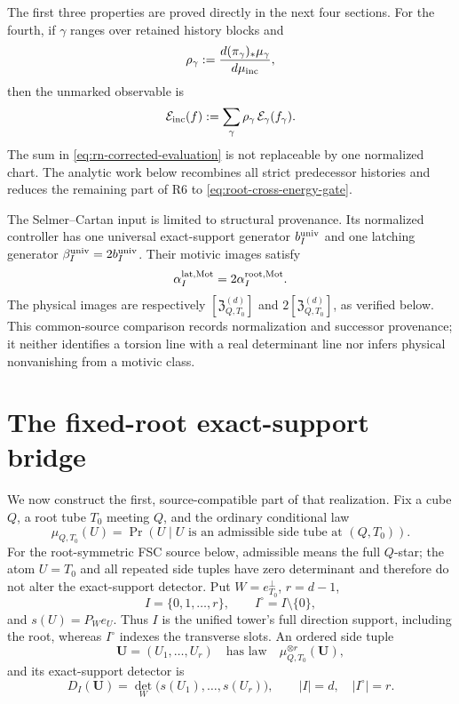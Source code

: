 \documentclass[11pt]{article}
\newcommand{\Mot}{\mathrm{Mot}}
\begin{document}
The first three properties are proved directly in the next four sections.
For the fourth, if \(\gamma\) ranges over retained history blocks and
\[
 \rho_\gamma
 :=
 \frac{d(\pi_\gamma)_*\mu_\gamma}{d\mu_{\rm inc}},
\]
then the unmarked observable is
\begin{equation}\label{eq:rn-corrected-evaluation}
 \mathcal E_{\rm inc}(f)
 :=
 \sum_\gamma\rho_\gamma\,\mathcal E_\gamma(f_\gamma).
\end{equation}
The sum in \eqref{eq:rn-corrected-evaluation} is not replaceable by one
normalized chart.  The analytic work below recombines all strict predecessor
histories and reduces the remaining part of R6 to
\eqref{eq:root-cross-energy-gate}.

The Selmer--Cartan input is limited to structural provenance.  Its normalized
controller has one universal exact-support generator \(b_I^{\rm univ}\) and
one latching generator \(\beta_I^{\rm univ}=2b_I^{\rm univ}\).  Their motivic
images satisfy
\begin{equation}\label{eq:latching-root-comparison}
 \alpha_I^{\rm lat,\Mot}=2\alpha_I^{\rm root,\Mot}.
\end{equation}
The physical images are respectively
\([\mathfrak Z^{(d)}_{Q,T_0}]\) and
\(2[\mathfrak Z^{(d)}_{Q,T_0}]\), as verified below.  This common-source
comparison records normalization and successor provenance; it neither
identifies a torsion line with a real determinant line nor infers physical
nonvanishing from a motivic class.

\section{The fixed-root exact-support bridge}

We now construct the first, source-compatible part of that realization.  Fix a
cube \(Q\), a root tube \(T_0\) meeting \(Q\), and the ordinary conditional law
\[
 \mu_{Q,T_0}(U)
 =\Pr(U\mid U\text{ is an admissible side tube at }(Q,T_0)).
\]
For the root-symmetric FSC source below, admissible means the full
\(Q\)-star; the atom \(U=T_0\) and all repeated side tuples have zero
determinant and therefore do not alter the exact-support detector.
Put \(W=e_{T_0}^{\perp}\), \(r=d-1\),
\[
 I=\{0,1,\ldots,r\},\qquad I^\circ=I\setminus\{0\},
\]
and \(s(U)=P_W e_U\).  Thus \(I\) is the unified tower's full direction support,
including the root, whereas \(I^\circ\) indexes the transverse slots.  An
ordered side tuple
\[
 \mathbf U=(U_1,\ldots,U_r)
 \quad\text{has law}\quad
 \mu_{Q,T_0}^{\otimes r}(\mathbf U),
\]
and its exact-support detector is
\begin{equation}\label{eq:physical-exact-support-detector}
 D_I(\mathbf U)
 =\det_W\bigl(s(U_1),\ldots,s(U_r)\bigr),
 \qquad |I|=d,\quad |I^\circ|=r.
\end{equation}
\end{document}

